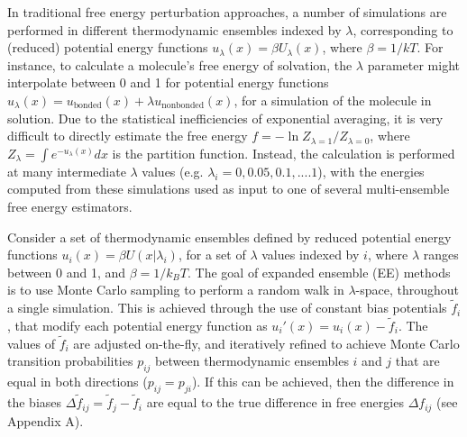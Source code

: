 \documentclass[%
 aip,
rsi,%
 amsmath,amssymb,
 reprint,%
]{revtex4-1}
\begin{document}
In traditional free energy perturbation approaches, a number of simulations are performed in different thermodynamic ensembles indexed by $\lambda$, corresponding to (reduced) potential energy functions $u_{\lambda}(x) = \beta U_{\lambda}(x)$, where $\beta = 1/kT$.  For instance, to calculate a molecule's free energy of solvation, the $\lambda$ parameter might interpolate between 0 and 1 for potential energy functions $u_{\lambda}(x) = u_{\text{bonded}}(x) + \lambda u_{\text{nonbonded}}(x)$, for a simulation of the molecule in solution.  Due to the statistical inefficiencies of exponential averaging, it is very difficult to directly estimate the free energy $f = -\ln Z_{\lambda=1}/Z_{\lambda=0}$, where $Z_{\lambda} = \int e^{-u_{\lambda}(x)} dx$ is the partition function.  Instead,  the calculation is performed at many intermediate $\lambda$ values (e.g. $\lambda_i = 0, 0.05, 0.1, .... 1$), with the energies computed from these simulations used as input to one of several multi-ensemble free energy estimators.\cite{shirts2008statistically, TI} 

Consider a set of thermodynamic ensembles defined by reduced potential energy functions $u_i(x) = \beta U(x|\lambda_i)$, for a set of $\lambda$ values indexed by $i$, where $\lambda$ ranges between 0 and 1, and $\beta = 1/k_BT$.  The goal of expanded ensemble (EE) methods is to use Monte Carlo sampling to perform a random walk in $\lambda$-space, throughout a single simulation.  This is achieved through the use of constant bias potentials $\tilde{f}_i$, that modify each potential energy function as $u_i'(x) = u_i(x) - \tilde{f}_i$. The values of $\tilde{f}_i$ are adjusted on-the-fly, and iteratively refined to achieve Monte Carlo transition probabilities $p_{ij}$ between thermodynamic ensembles $i$ and $j$ that are equal in both directions ($p_{ij} = p_{ji}$).  If this can be achieved, then the difference in the biases $\Delta \tilde{f}_{ij} = \tilde{f}_j - \tilde{f}_i$ are equal to the true difference in free energies $\Delta f_{ij}$ (see Appendix A).

\end{document}

